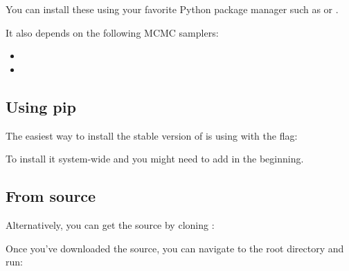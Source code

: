 \documentclass[a4paper,11pt,english]{sphinxmanual}
\begin{document}
You can install these using your favorite Python package manager such as  or .

It also depends on the following MCMC samplers:
\begin{itemize}
\item {} 

\item {} 

\end{itemize}


\subsection{Using pip}
\label{\detokenize{install:using-pip}}
The easiest way to install the stable version of  is
using  with the  flag:

%
\begin{sphinxVerbatim}[commandchars=\\\{\}]
   
\end{sphinxVerbatim}

To install it system-wide and you might need to add  in the beginning.


\subsection{From source}
\label{\detokenize{install:from-source}}
Alternatively, you can get the source by cloning :

%
\begin{sphinxVerbatim}[commandchars=\\\{\}]
  
\end{sphinxVerbatim}

Once you’ve downloaded the source, you can navigate to the root directory and run:
\end{document}
